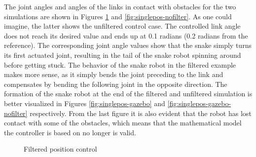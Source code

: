 The joint angles and angles of the links in contact with obstacles for the two simulations are shown in Figures \ref{fig:singlepos} and \ref{fig:singlepos-nofilter}. As one could imagine, the latter shows the unfiltered control case. The controlled link angle does not reach its desired value and ends up at 0.1 radians (0.2 radians from the reference). The corresponding joint angle values show that the snake simply turns its first actuated joint, resulting in the tail of the snake robot spinning around before getting stuck. The behavior of the snake robot in the filtered example makes more sense, as it simply bends the joint preceding to the link and compensates by bending the following joint in the opposite direction. The formation of the snake robot at the end of the filtered and unfiltered simulation is better visualized in Figures \ref{fig:singlepos-gazebo} and \ref{fig:singlepos-gazebo-nofilter} respectively. From the last figure it is also evident that the robot has lost contact with some of the obstacles, which means that the mathematical model the controller is based on no longer is valid.

\begin{figure}
    \centering
    
    \hfil

    \caption{Filtered position control}
    \label{fig:singlepos}
\end{figure}

